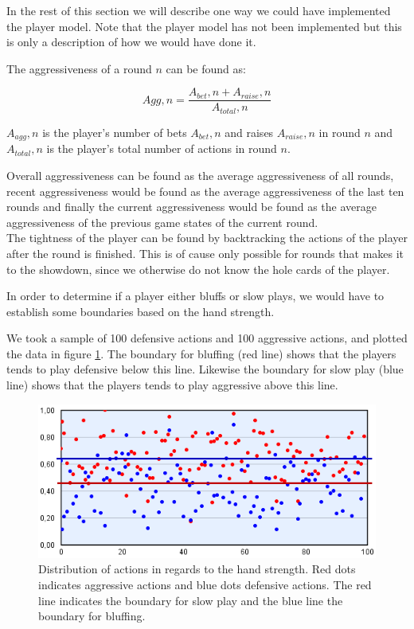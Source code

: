 In the rest of this section we will describe one way we could have implemented the player model. Note that the player model has not been implemented but this is only a description of how we would have done it.

The aggressiveness of a round $n$ can be found as:

\[Agg,n = \frac{A_{bet},n + A_{raise},n}{A_{total},n}\]

$A_{agg},n$ is the player's number of bets $A_{bet},n$ and raises $A_{raise},n$ in round $n$ and  $A_{total},n$ is the player's total number of actions in round $n$. 

Overall aggressiveness can be found as the average aggressiveness of all rounds, recent aggressiveness would be found as the average aggressiveness of the last ten rounds and finally the current aggressiveness would be found as the average aggressiveness of the previous game states of the current round.\\

The tightness of the player can be found by backtracking the actions of the player after the round is finished. This is of cause only possible for rounds that makes it to the showdown, since we otherwise do not know the hole cards of the player.

In order to determine if a player either bluffs or slow plays, we would have to establish some boundaries based on the hand strength. 

We took a sample of 100 defensive actions and 100 aggressive actions, and plotted the data in figure \ref{fig:dist-act}. The boundary for bluffing (red line) shows that the players tends to play defensive below this line. Likewise the boundary for slow play (blue line) shows that the players tends to play aggressive above this line.

\begin{figure}[H]
  \center
    \includegraphics[scale=0.775]{images/modeling/action-dist.png}
  \caption{Distribution of actions in regards to the hand strength. Red dots indicates aggressive actions and blue dots defensive actions. The red line indicates the boundary for slow play and the blue line the boundary for bluffing. \label{fig:dist-act}}
\end{figure}

